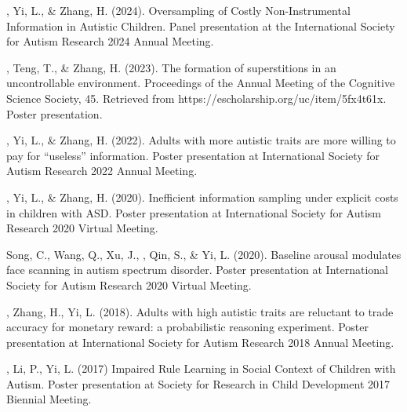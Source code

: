\begin{etaremune}
  \item \ME, Yi, L., \& Zhang, H. (2024). Oversampling of Costly Non-Instrumental Information in Autistic Children. Panel presentation at the International Society for Autism Research 2024 Annual Meeting.
  \item \ME, Teng, T., \& Zhang, H. (2023). The formation of superstitions in an uncontrollable environment. Proceedings of the Annual Meeting of the Cognitive Science Society, 45. Retrieved from https://escholarship.org/uc/item/5fx4t61x. Poster presentation.
  \item \ME, Yi, L., \& Zhang, H. (2022). Adults with more autistic traits are more willing to pay for “useless” information. Poster presentation at International Society for Autism Research 2022 Annual Meeting.
  \item \ME, Yi, L., \& Zhang, H. (2020). Inefficient information sampling under explicit costs in children with ASD. Poster presentation at International Society for Autism Research 2020 Virtual Meeting.
  \item Song, C., Wang, Q., Xu, J., \ME, Qin, S., \& Yi, L. (2020). Baseline arousal modulates face scanning in autism spectrum disorder. Poster presentation at International Society for Autism Research 2020 Virtual Meeting.
  \item \ME, Zhang, H., Yi, L. (2018). Adults with high autistic traits are reluctant to trade accuracy for monetary reward: a probabilistic reasoning experiment. Poster presentation at International Society for Autism Research 2018 Annual Meeting.
  \item \ME, Li, P., Yi, L. (2017) Impaired Rule Learning in Social Context of Children with Autism. Poster presentation at Society for Research in Child Development 2017 Biennial Meeting.
\end{etaremune}

